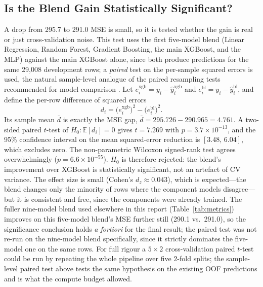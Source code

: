\documentclass[journal]{IEEEtran}
\begin{document}
\subsection{Is the Blend Gain Statistically Significant?}
\label{sec:significance}
A drop from 295.7 to 291.0 MSE is small, so it is tested whether the gain is
real or just cross-validation noise. This test uses the first five-model blend
(Linear Regression, Random Forest, Gradient Boosting, the main XGBoost, and
the MLP) against the main XGBoost alone, since both produce predictions for
the same 29{,}008 development rows; a \emph{paired} test on the per-sample
squared errors is used, the natural sample-level analogue of the paired
resampling tests recommended for model comparison \cite{dietterich1998}. Let
$e_i^{\text{xgb}}=y_i-\hat y_i^{\text{xgb}}$ and
$e_i^{\text{bl}}=y_i-\hat y_i^{\text{bl}}$, and define the per-row difference of
squared errors
\begin{equation}
d_i=\big(e_i^{\text{xgb}}\big)^{2}-\big(e_i^{\text{bl}}\big)^{2}.
\label{eq:diff}
\end{equation}
Its sample mean $\bar d$ is exactly the MSE gap, $\bar d = 295.726-290.965=4.761$.
A two-sided paired $t$-test of $H_0:\mathbb{E}[d_i]=0$ gives $t=7.269$ with
$p=3.7\times10^{-13}$, and the 95\% confidence interval on the mean
squared-error reduction is $[3.48,\,6.04]$, which excludes zero. The
non-parametric Wilcoxon signed-rank test agrees overwhelmingly
($p=6.6\times10^{-55}$). $H_0$ is therefore rejected: the blend's improvement
over XGBoost is statistically significant, not an artefact of CV variance. The
effect size is small (Cohen's $d_z\approx0.043$), which is expected---the
blend changes only the minority of rows where the component models
disagree---but it is consistent and free, since the components were already
trained. The fuller nine-model blend used elsewhere in this report
(Table~\ref{tab:metrics}) improves on this five-model blend's MSE further
still (290.1 vs.\ 291.0), so the significance conclusion holds \emph{a
fortiori} for the final result; the paired test was not re-run on the
nine-model blend specifically, since it strictly dominates the five-model one
on the same rows. For full rigour a $5\times2$ cross-validation paired
$t$-test \cite{dietterich1998} could be run by repeating the whole pipeline
over five $2$-fold splits; the sample-level paired test above tests the same
hypothesis on the existing OOF predictions and is what the compute budget
allowed.
\end{document}
